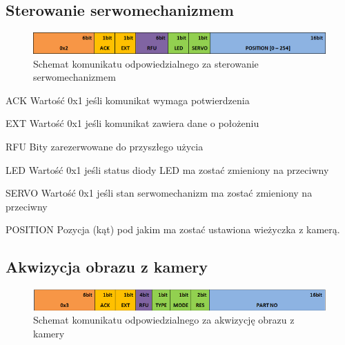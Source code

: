 \subsection{Sterowanie serwomechanizmem}
\begin{figure}[h!] 
 \centering
 \includegraphics[width=\textwidth]{../images/appendix/cmd_0x02.png}
 \caption{Schemat komunikatu odpowiedzialnego za sterowanie serwomechanizmem}
 \label{fig:CMD_0x02}
\end{figure}

\begin{basedescript}{\desclabelstyle{\pushlabel}\desclabelwidth{25mm}}
\setlength{\parsep}{0pt}
\setlength{\itemsep}{0mm}
\setlength{\parskip}{0pt}
\item[ACK]
	Wartość 0x1 jeśli komunikat wymaga potwierdzenia
\item[EXT] 
	Wartość 0x1 jeśli komunikat zawiera dane o położeniu
\item[RFU] 
	Bity zarezerwowane do przyszłego użycia
\item[LED] 
	Wartość 0x1 jeśli status diody LED ma zostać zmieniony na przeciwny
\item[SERVO] 
	Wartość 0x1 jeśli stan serwomechanizm ma zostać zmieniony na przeciwny
\item[POSITION] 
	Pozycja (kąt) pod jakim ma zostać ustawiona wieżyczka z kamerą.
\end{basedescript}

\subsection{Akwizycja obrazu z kamery}
\begin{figure}[h!] 
 \centering
 \includegraphics[width=\textwidth]{../images/appendix/cmd_0x03.png}
 \caption{Schemat komunikatu odpowiedzialnego za akwizycję obrazu z kamery}
 \label{fig:CMD_0x03}
\end{figure}

